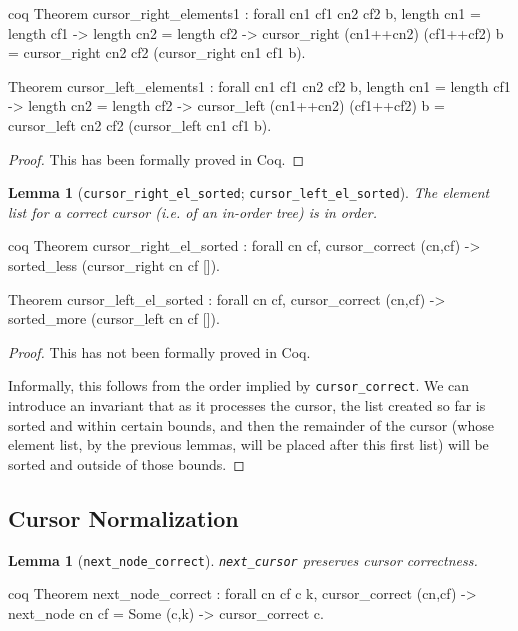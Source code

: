 \documentclass[12pt]{article}
\newtheorem{lemma}[theorem]{Lemma}
\newcommand{\nocontentsline}[3]{}
\newcommand{\tocless}[2]{\bgroup\let\addcontentsline=\nocontentsline#1{#2}\egroup}
\begin{document}
\begin{appendices}
\begin{singlespace}
\begin{cminted}{coq}
Theorem cursor_right_elements1 : forall cn1 cf1 cn2 cf2 b,
  length cn1 = length cf1 -> length cn2 = length cf2 ->
  cursor_right (cn1++cn2) (cf1++cf2) b =
  cursor_right cn2 cf2 (cursor_right cn1 cf1 b).

Theorem cursor_left_elements1 : forall cn1 cf1 cn2 cf2 b,
  length cn1 = length cf1 -> length cn2 = length cf2 ->
  cursor_left (cn1++cn2) (cf1++cf2) b =
  cursor_left cn2 cf2 (cursor_left cn1 cf1 b).
\end{cminted}

\begin{proof}
This has been formally proved in Coq.
\end{proof}

\begin{lemma}[\texttt{cursor\_right\_el\_sorted}; \texttt{cursor\_left\_el\_sorted}]
The element list for a correct cursor (i.e. of an in-order tree) is in order.
\end{lemma}

\begin{cminted}{coq}
Theorem cursor_right_el_sorted : forall cn cf,
  cursor_correct (cn,cf) -> sorted_less (cursor_right cn cf []).

Theorem cursor_left_el_sorted : forall cn cf,
  cursor_correct (cn,cf) -> sorted_more (cursor_left cn cf []).
\end{cminted}

\begin{proof}
This has not been formally proved in Coq.

Informally, this follows from the order implied by \texttt{cursor\_correct}. We can introduce an invariant that as it processes the cursor, the list created so far is sorted and within certain bounds, and then the remainder of the cursor (whose element list, by the previous lemmas, will be placed after this first list) will be sorted and outside of those bounds.
\end{proof}

\tocless\subsection{Cursor Normalization}

\begin{lemma}[\texttt{next\_node\_correct}]
\texttt{next\_cursor} preserves cursor correctness.
\end{lemma}

\begin{cminted}{coq}
Theorem next_node_correct : forall cn cf c k,
  cursor_correct (cn,cf) -> next_node cn cf = Some (c,k) ->
  cursor_correct c.
\end{cminted}


\end{singlespace}
\end{appendices}
\end{document}
